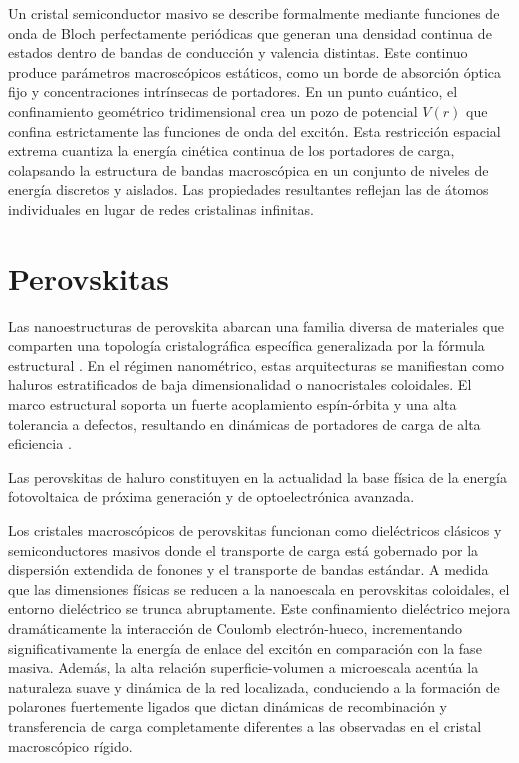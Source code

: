 \documentclass[pdflatex,sn-mathphys-num]{sn-jnl}
\theoremstyle{thmstyleone}%
\theoremstyle{thmstyletwo}%
\theoremstyle{thmstylethree}%
\begin{document}
Un cristal semiconductor masivo se describe formalmente mediante funciones de
onda de Bloch perfectamente periódicas que generan una densidad continua de
estados dentro de bandas de conducción y valencia distintas. Este continuo
produce parámetros macroscópicos estáticos, como un borde de absorción óptica
fijo y concentraciones intrínsecas de portadores. En un punto cuántico, el
confinamiento geométrico tridimensional crea un pozo de potencial $V(r)$ que
confina estrictamente las funciones de onda del excitón. Esta restricción
espacial extrema cuantiza la energía cinética continua de los portadores de
carga, colapsando la estructura de bandas macroscópica en un conjunto de
niveles de energía discretos y aislados. Las propiedades resultantes reflejan
las de átomos individuales en lugar de redes cristalinas infinitas.

\section{Perovskitas}
\label{sec:perovskitas}

Las nanoestructuras de perovskita abarcan una familia diversa de materiales
que comparten una topología cristalográfica específica generalizada por la
fórmula estructural . En el régimen nanométrico, estas arquitecturas
se manifiestan como haluros estratificados de baja dimensionalidad o
nanocristales coloidales. El marco estructural soporta un fuerte acoplamiento
espín-órbita y una alta tolerancia a defectos, resultando en dinámicas de
portadores de carga de alta eficiencia
\cite{shenSoftOpticalMaterials2024, tanPhotoprocessingPerovskitesCurrent2022}.

Las perovskitas de haluro constituyen en la actualidad la base física de la
energía fotovoltaica de próxima generación y de optoelectrónica avanzada.

Los cristales macroscópicos de perovskitas  funcionan como dieléctricos
clásicos y semiconductores masivos donde el transporte de carga está gobernado
por la dispersión extendida de fonones y el transporte de bandas estándar.
A medida que las dimensiones físicas se reducen a la nanoescala en perovskitas
coloidales, el entorno dieléctrico se trunca abruptamente. Este confinamiento
dieléctrico mejora dramáticamente la interacción de Coulomb electrón-hueco,
incrementando significativamente la energía de enlace del excitón en comparación
con la fase masiva. Además, la alta relación superficie-volumen a microescala
acentúa la naturaleza suave y dinámica de la red localizada, conduciendo a la
formación de polarones fuertemente ligados que dictan dinámicas de recombinación
y transferencia de carga completamente diferentes a las observadas en el cristal
macroscópico rígido.
\end{document}
